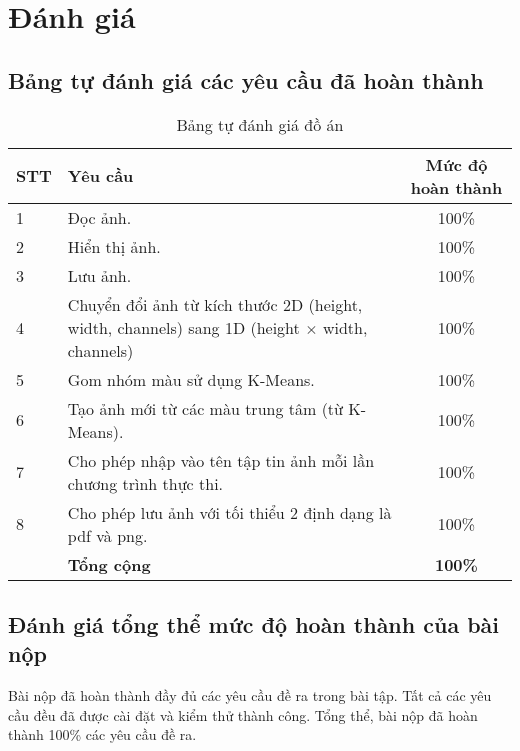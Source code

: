 \section{Đánh giá}
\subsection{Bảng tự đánh giá các yêu cầu đã hoàn thành}

\begin{center}
  \begin{table}[H]
    \centering
    \caption{Bảng tự đánh giá đồ án}
    \renewcommand{\arraystretch}{1.4}
    \begin{tabular}{|l|p{}|c|}
      \hline
      \textbf{STT} & \textbf{Yêu cầu}                                                                                    & \textbf{Mức độ hoàn thành} \\ \hline
      1            & Đọc ảnh.                                                                                            & 100\%                      \\ \hline
      2            & Hiển thị ảnh.                                                                                       & 100\%                      \\ \hline
      3            & Lưu ảnh.                                                                                            & 100\%                      \\ \hline

      4            & Chuyển đổi ảnh từ kích thước 2D (height, width, channels) sang 1D (height $\times$ width, channels) & 100\%                      \\ \hline

      5            & Gom nhóm màu sử dụng K-Means.                                                                       & 100\%                      \\ \hline
      6            & Tạo ảnh mới từ các màu trung tâm (từ K-Means).                                                      & 100\%                      \\ \hline
      7            & Cho phép nhập vào tên tập tin ảnh mỗi lần chương trình thực thi.                                    & 100\%                      \\ \hline
      8            & Cho phép lưu ảnh với tối thiểu 2 định dạng là pdf và png.                                           & 100\%                      \\ \hline
                   & \textbf{Tổng cộng}                                                                                  & \textbf{100\%}             \\ \hline
    \end{tabular}
    \label{tab:mytable}
  \end{table}
\end{center}

\subsection{Đánh giá tổng thể mức độ hoàn thành của bài nộp}

Bài nộp đã hoàn thành đầy đủ các yêu cầu đề ra trong bài tập. Tất cả các yêu cầu đều đã được cài đặt và kiểm thử thành công. Tổng thể, bài nộp đã hoàn thành 100\% các yêu cầu đề ra.
